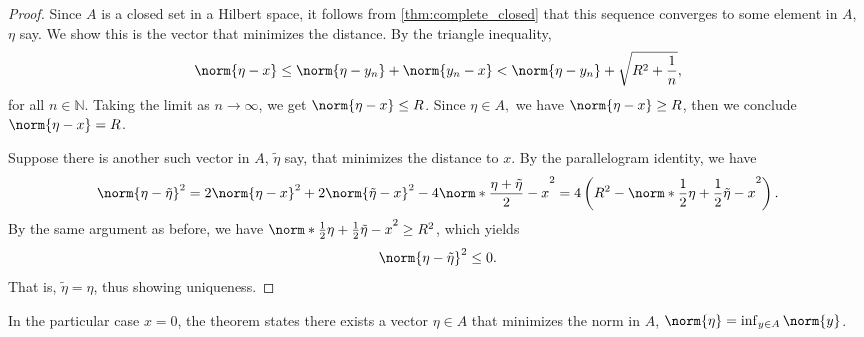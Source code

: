 \begin{proof}
    Since \(A\) is a closed set in a Hilbert space, it follows from \cref{thm:complete_closed} that this sequence converges to some element in \(A\), \(\eta\) say. We show this is the vector that minimizes the distance. By the triangle inequality,
    \begin{equation*}
        \norm{\eta - x} \leq \norm{\eta - y_n} + \norm{y_n - x} < \norm{\eta - y_n} + \sqrt{R^2 + \frac1{n}},
    \end{equation*}
    for all \(n \in \mathbb{N}\). Taking the limit as \(n \to \infty\), we get \(\norm{\eta - x} \leq R\). Since \(\eta \in A,\) we have \(\norm{\eta - x} \geq R\), then we conclude \(\norm{\eta - x} = R\).

    Suppose there is another such vector in \(A\), \(\tilde{\eta}\) say, that minimizes the distance to \(x\). By the parallelogram identity, we have
    \begin{equation*}
        \norm{\eta - \tilde{\eta}}^2 = 2\norm{\eta - x}^2 + 2\norm{\tilde{\eta} - x}^2 - 4\norm*{\frac{\eta + \tilde{\eta}}{2} - x}^2 = 4\left(R^2 - \norm*{\frac12\eta + \frac12\tilde{\eta} - x}^2\right).
\end{equation*}
    By the same argument as before, we have \(\norm*{\frac12\eta + \frac12 \tilde{\eta} - x}^2 \geq R^2\), which yields
    \begin{equation*}
        \norm{\eta - \tilde{\eta}}^2 \leq 0.
    \end{equation*}
    That is, \(\tilde{\eta} = \eta\), thus showing uniqueness.
\end{proof}
\begin{remark}
    In the particular case \(x = 0\), the theorem states there exists a vector \(\eta \in A\) that minimizes the norm in \(A\), \(\norm{\eta} = \inf_{y \in A} \norm{y}\).
\end{remark}
